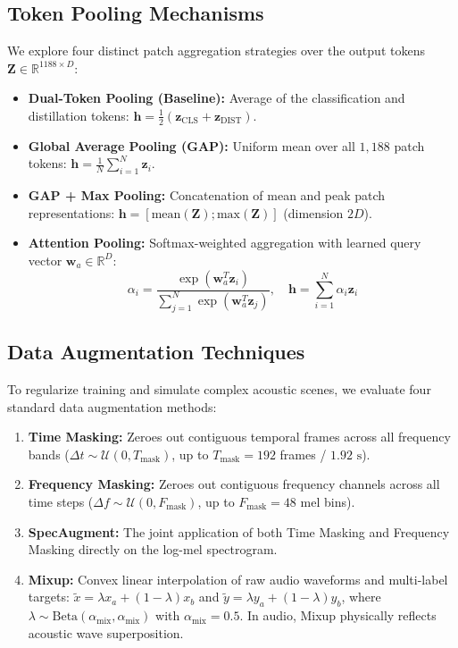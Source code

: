 \documentclass[11pt,a4paper]{article}
\begin{document}
\subsection{Token Pooling Mechanisms}
We explore four distinct patch aggregation strategies over the output tokens $\mathbf{Z} \in \mathbb{R}^{1188 \times D}$:
\begin{itemize}
    \item \textbf{Dual-Token Pooling (Baseline):} Average of the classification and distillation tokens: $\mathbf{h} = \frac{1}{2}(\mathbf{z}_{\text{CLS}} + \mathbf{z}_{\text{DIST}})$.
    \item \textbf{Global Average Pooling (GAP):} Uniform mean over all $1,188$ patch tokens: $\mathbf{h} = \frac{1}{N}\sum_{i=1}^N \mathbf{z}_i$.
    \item \textbf{GAP + Max Pooling:} Concatenation of mean and peak patch representations: $\mathbf{h} = [\text{mean}(\mathbf{Z}); \text{max}(\mathbf{Z})]$ (dimension $2D$).
    \item \textbf{Attention Pooling:} Softmax-weighted aggregation with learned query vector $\mathbf{w}_a \in \mathbb{R}^D$:
    \begin{equation}
        \alpha_i = \frac{\exp(\mathbf{w}_a^T \mathbf{z}_i)}{\sum_{j=1}^N \exp(\mathbf{w}_a^T \mathbf{z}_j)}, \quad \mathbf{h} = \sum_{i=1}^N \alpha_i \mathbf{z}_i
    \end{equation}
\end{itemize}

\subsection{Data Augmentation Techniques}
\label{sec:data_augmentations}
To regularize training and simulate complex acoustic scenes, we evaluate four standard data augmentation methods:
\begin{enumerate}
    \item \textbf{Time Masking:} Zeroes out contiguous temporal frames across all frequency bands ($\Delta t \sim \mathcal{U}(0, T_{\text{mask}})$, up to $T_{\text{mask}} = 192$ frames / $1.92\text{ s}$).
    \item \textbf{Frequency Masking:} Zeroes out contiguous frequency channels across all time steps ($\Delta f \sim \mathcal{U}(0, F_{\text{mask}})$, up to $F_{\text{mask}} = 48$ mel bins).
    \item \textbf{SpecAugment:} The joint application of both Time Masking and Frequency Masking directly on the log-mel spectrogram.
    \item \textbf{Mixup:} Convex linear interpolation of raw audio waveforms and multi-label targets: $\tilde{x} = \lambda x_a + (1 - \lambda) x_b$ and $\tilde{y} = \lambda y_a + (1 - \lambda) y_b$, where $\lambda \sim \text{Beta}(\alpha_{\text{mix}}, \alpha_{\text{mix}})$ with $\alpha_{\text{mix}} = 0.5$. In audio, Mixup physically reflects acoustic wave superposition.
\end{enumerate}
\end{document}

